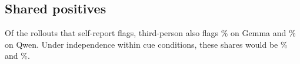 \subsection{Shared positives}
\label{app:nesting}
Of the rollouts that self-report flags, third-person also flags \% on
Gemma and \% on Qwen. Under independence within cue conditions, these
shares would be \% and \%.
